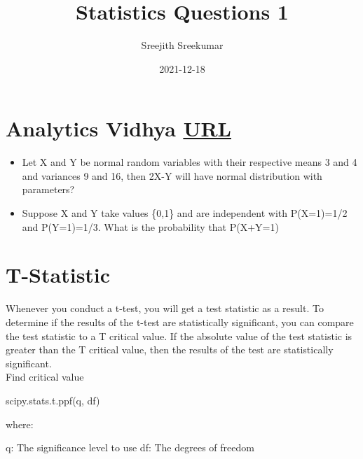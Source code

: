 \documentclass[11pt]{article}
\author{Sreejith Sreekumar}
\date{2021-12-18}
\title{Statistics Questions 1}
\begin{document}
\maketitle
\tableofcontents





\section{Analytics Vidhya \href{https://www.analyticsvidhya.com/blog/2021/04/25-probability-and-statistics-questions-to-ace-your-data-science-interviews/\#h2\_3}{\underline{URL}}}
\label{sec:orgc5c9f67}

\begin{itemize}
\item Let X and Y be normal random variables with their respective means 3 and 4 and variances 9 and 16, then 2X-Y will have normal distribution with parameters?
\item Suppose X and Y take values \{0,1\} and are independent with P(X=1)=1/2 and P(Y=1)=1/3. What is the probability that P(X+Y=1)
\end{itemize}

\section{T-Statistic}
\label{sec:org9f25354}

Whenever you conduct a t-test, you will get a test statistic as a result.
To determine if the results of the t-test are statistically significant, you can compare the test statistic to a
T critical value.
If the absolute value of the test statistic is greater than the T critical value,
then the results of the test are statistically significant. \\

Find critical value

scipy.stats.t.ppf(q, df)

where:

q: The significance level to use
df: The degrees of freedom
\end{document}
